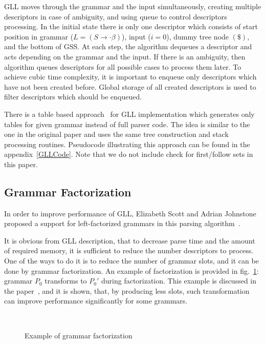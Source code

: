\documentclass[runningheads,a4paper]{llncs}
\begin{document}
GLL moves through the grammar and the input simultaneously, creating multiple descriptors in case of ambiguity, and using queue to control descriptors processing.
In the initial state there is only one descriptor which consists of start position in grammar
($L = (S \to \cdot \beta)$), input ($i=0$), dummy tree node $ (\$) $, and the bottom of GSS.
At each step, the algorithm dequeues a descriptor and acts depending on the grammar and the input.
If there is an ambiguity, then algorithm queues descriptors for all possible cases to process them later. 
To achieve cubic time complexity, it is important to enqueue only descriptors which have not been created before.
Global storage of all created descriptors is used to filter descriptors which should be enqueued.

There is a table based approach~\cite{ragozina} for GLL implementation which generates only tables for given grammar instead of full parser code.
The idea is similar to the one in the original paper and uses the same tree construction and stack processing routines.
Pseudocode illustrating this approach can be found in the appendix~\ref{GLLCode}.
Note that we do not include check for first/follow sets in this paper.


\subsection{Grammar Factorization}%

In order to improve performance of GLL, Elizabeth Scott and Adrian Johnstone proposed a support for left-factorized grammars in this parsing algorithm~\cite{scott2016structuring}. 

It is obvious from GLL description, that to decrease parse time and the amount of required memory, it is sufficient to reduce the number descriptors to process.
One of the ways to do it is to reduce the number of grammar slots, and it can be done by grammar factorization.
An example of factorization is provided in fig.~\ref{fig:ExampleOfFactorization}: grammar $P_0$ transforms to $P_0'$ during factorization.
This example is discussed in the paper~\cite{scott2016structuring}, and it is shown, that, by producing less slots, such transformation can improve performance significantly for some grammars.

\begin{figure}
    \centering
    ~
    \caption{Example of grammar factorization}
    \label{fig:ExampleOfFactorization}
\end{figure}
\end{document}
